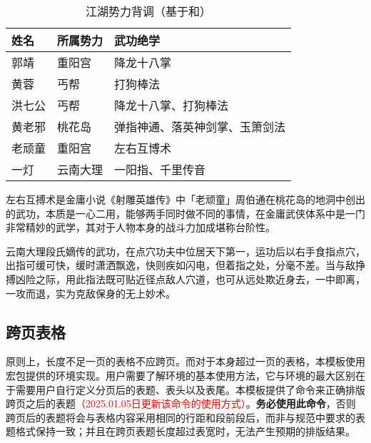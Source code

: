 \documentclass[print, doctor, vlined]{DissertUESTC}
\begin{document}
	\begin{table}[!ht]
		\caption{江湖势力背调（基于和）} \label{tab: 江湖势力背调（基于puttablenotelabel和tablenoteref）}
		\begin{threeparttable}
			\begin{tabular}{p{2cm} p{3cm} p{7cm}}
				\toprule
				\textbf{姓名} & \textbf{所属势力} & \textbf{武功绝学} \\
				\midrule
				郭靖 & 重阳宫 & 降龙十八掌 \\
				黄蓉 & 丐帮 & 打狗棒法 \\
				洪七公 & 丐帮 & 降龙十八掌、打狗棒法 \\
				黄老邪 & 桃花岛 & 弹指神通、落英神剑掌、玉箫剑法 \\
				老顽童 & 重阳宫 & 左右互博术\tablenoteref{tn: 左右互搏术} \\
				一灯 & 云南大理 & 一阳指\tablenoteref{tn: 一阳指}、千里传音 \\
				\bottomrule
			\end{tabular}
			\begin{tablenotes}
				\item[\puttablenotelabel{tn: 左右互搏术}] 左右互搏术是金庸小说《射雕英雄传》中「老顽童」周伯通在桃花岛的地洞中创出的武功，本质是一心二用，能够两手同时做不同的事情，在金庸武侠体系中是一门非常精妙的武学，其对于人物本身的战斗力加成堪称台阶性。
				\item[\puttablenotelabel{tn: 一阳指}] 云南大理段氏嫡传的武功，在点穴功夫中位居天下第一，运功后以右手食指点穴，出指可缓可快，缓时潇洒飘逸，快则疾如闪电，但着指之处，分毫不差。当与敌挣搏凶险之际，用此指法既可贴近径点敌人穴道，也可从远处欺近身去，一中即离，一攻而退，实为克敌保身的无上妙术。
			\end{tablenotes}
		\end{threeparttable}
	\end{table}
	
	
	\clearpage
	\subsection{跨页表格}
	
	原则上，长度不足一页的表格不应跨页。而对于本身超过一页的表格，本模板使用\href{https://mirrors.tuna.tsinghua.edu.cn/CTAN/macros/latex/required/tools/longtable.pdf}{}宏包提供的环境实现。用户需要了解环境的基本使用方法，它与环境的最大区别在于需要用户自行定义分页后的表题、表头以及表尾。本模板提供了命令来正确排版跨页之后的表题\textcolor{red}{（2025.01.05日更新该命令的使用方式）}。\textbf{务必使用此命令}，否则跨页后的表题将会与表格内容采用相同的行距和段前段后，而非与规范中要求的表题格式保持一致；并且在跨页表题长度超过表宽时，无法产生预期的排版结果。
	
\end{document}
